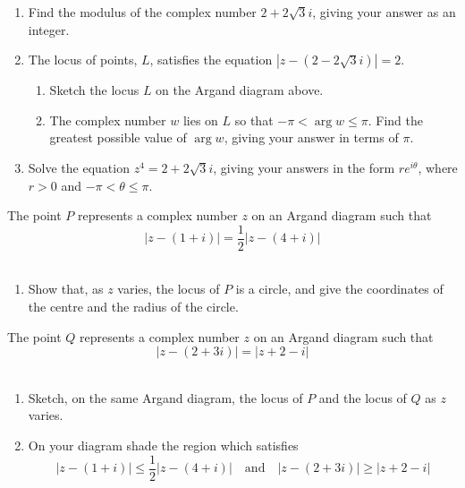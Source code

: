 \documentclass[leqno]{article}
\begin{document}
\begin{enumerate}[
  label=\textbf{\arabic*.},
  leftmargin=*,
  topsep=0pt,
  partopsep=0pt,
  parsep=0pt
]
\begin{enumerate}[label=\textbf{(\alph*)}]
  \item Find the modulus of the complex number $2+2\sqrt{3}i$, giving your answer as an integer.  \\
  \item The locus of points, $L$, satisfies the equation $|z-(2-2\sqrt{3}i)|=2$.
  \begin{enumerate}[label=(\roman*)]
    \item Sketch the locus $L$ on the Argand diagram above. 
    \item The complex number $w$ lies on $L$ so that $-\pi<\arg w\leq \pi$. Find the greatest possible value of $\arg w$, giving your answer in terms of $\pi$.  \\
  \end{enumerate}
  \item Solve the equation $z^4=2+2\sqrt{3}i$, giving your answers in the form $re^{i\theta}$, where $r>0$ and $-\pi<\theta\leq \pi$.  \\
\end{enumerate}

\newpage

\questionitem

The point $P$ represents a complex number $z$ on an Argand diagram such that
\[
|z-(1+i)|=\frac{1}{2}|z-(4+i)|
\] \\

\begin{enumerate}[label=\textbf{(\alph*)}]
  \item Show that, as $z$ varies, the locus of $P$ is a circle, and give the coordinates of the centre and the radius of the circle.  \\
\end{enumerate}

The point $Q$ represents a complex number $z$ on an Argand diagram such that
\[
|z-(2+3i)|=|z+2-i|
\] \\

\begin{enumerate}[label=\textbf{(\alph*)}, resume]
  \item Sketch, on the same Argand diagram, the locus of $P$ and the locus of $Q$ as $z$ varies.  \\
  \item On your diagram shade the region which satisfies
  \[
  |z-(1+i)|\le \frac{1}{2}|z-(4+i)| \quad \text{and} \quad |z-(2+3i)|\ge |z+2-i|
  \]
\end{enumerate}


\end{enumerate}
\end{document}
